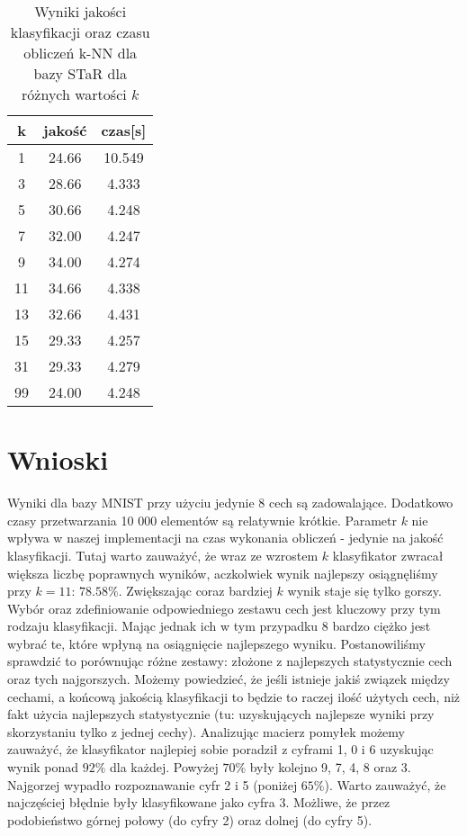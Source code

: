 \documentclass{classrep}
\begin{document}
\begin{table}[h!]
  \centering
  \caption{Wyniki jakości klasyfikacji oraz czasu obliczeń k-NN dla bazy STaR dla różnych wartości $k$}
  \label{tab:tab1}
  \begin{tabular}{|c|c|c|}
    \hline
	k & jakość & czas[s]\\
    \hline
	1 & 24.66 & 10.549\\
    \hline
	3 & 28.66 & 4.333\\
	\hline
	5 & 30.66 & 4.248\\
	\hline
	7 & 32.00 & 4.247\\
	\hline
	9 & 34.00 & 4.274\\
	\hline
	11 & 34.66 & 4.338\\
	\hline
	13 & 32.66 & 4.431\\
	\hline
	15 & 29.33 & 4.257\\
	\hline
	31 & 29.33 & 4.279\\
	\hline
	99 & 24.00 & 4.248\\
	\hline
  \end{tabular}
\end{table}

\section{Wnioski}

Wyniki dla bazy MNIST przy użyciu jedynie 8 cech są zadowalające. Dodatkowo czasy przetwarzania 10 000 elementów są relatywnie krótkie. Parametr $k$ nie wpływa w naszej implementacji na czas wykonania obliczeń - jedynie na jakość klasyfikacji. Tutaj warto zauważyć, że wraz ze wzrostem $k$ klasyfikator zwracał większa liczbę poprawnych wyników, aczkolwiek wynik najlepszy osiągnęliśmy przy $k=11$: $78.58\%$. Zwiększając coraz bardziej $k$ wynik staje się tylko gorszy. Wybór oraz zdefiniowanie odpowiedniego zestawu cech jest kluczowy przy tym rodzaju klasyfikacji. Mając jednak ich w tym przypadku 8 bardzo ciężko jest wybrać te, które wpłyną na osiągnięcie najlepszego wyniku. Postanowiliśmy sprawdzić to porównując różne zestawy: złożone z najlepszych statystycznie cech oraz tych najgorszych. Możemy powiedzieć, że jeśli istnieje jakiś związek między cechami, a końcową jakością klasyfikacji to będzie to raczej ilość użytych cech, niż fakt użycia najlepszych statystycznie (tu: uzyskujących najlepsze wyniki przy skorzystaniu tylko z jednej cechy). Analizując macierz pomyłek możemy zauważyć, że klasyfikator najlepiej sobie poradził z cyframi 1, 0 i 6 uzyskując wynik ponad $92\%$ dla każdej. Powyżej $70\%$ były kolejno 9, 7, 4, 8 oraz 3. Najgorzej wypadło rozpoznawanie cyfr 2 i 5 (poniżej $65\%$). Warto zauważyć, że najczęściej błędnie były klasyfikowane jako cyfra 3. Możliwe, że przez podobieństwo górnej połowy (do cyfry 2) oraz dolnej (do cyfry 5).
\end{document}
